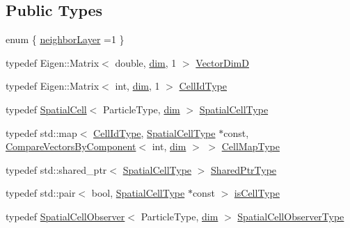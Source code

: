 \subsection*{Public Types}
\begin{DoxyCompactItemize}
\item 
enum \{ \hyperlink{structmodel_1_1_spatial_cell_a477a83780a744121d409df1bc0612d94a0faf1db991c3be6255b6273fdffe2eea}{neighbor\+Layer} =1
 \}
\item 
typedef Eigen\+::\+Matrix$<$ double, \hyperlink{plot_nd_a_8m_a382f3ca768b275b8d563604f7fc7df73}{dim}, 1 $>$ \hyperlink{structmodel_1_1_spatial_cell_aeaaeb951297c67dde8b981038936d7b8}{Vector\+Dim\+D}
\item 
typedef Eigen\+::\+Matrix$<$ int, \hyperlink{plot_nd_a_8m_a382f3ca768b275b8d563604f7fc7df73}{dim}, 1 $>$ \hyperlink{structmodel_1_1_spatial_cell_acc48b0ece2bb5487d1ea96903dbbe626}{Cell\+Id\+Type}
\item 
typedef \hyperlink{structmodel_1_1_spatial_cell}{Spatial\+Cell}$<$ Particle\+Type, \hyperlink{plot_nd_a_8m_a382f3ca768b275b8d563604f7fc7df73}{dim} $>$ \hyperlink{structmodel_1_1_spatial_cell_a21ae9e280e12b732db8ac384d6fb587c}{Spatial\+Cell\+Type}
\item 
typedef std\+::map$<$ \hyperlink{structmodel_1_1_spatial_cell_acc48b0ece2bb5487d1ea96903dbbe626}{Cell\+Id\+Type}, \hyperlink{structmodel_1_1_spatial_cell_a21ae9e280e12b732db8ac384d6fb587c}{Spatial\+Cell\+Type} $\ast$const, \hyperlink{structmodel_1_1_compare_vectors_by_component}{Compare\+Vectors\+By\+Component}$<$ int, \hyperlink{plot_nd_a_8m_a382f3ca768b275b8d563604f7fc7df73}{dim} $>$ $>$ \hyperlink{structmodel_1_1_spatial_cell_a4c03425d6c8328b5587c9b385d1b9a26}{Cell\+Map\+Type}
\item 
typedef std\+::shared\+\_\+ptr$<$ \hyperlink{structmodel_1_1_spatial_cell_a21ae9e280e12b732db8ac384d6fb587c}{Spatial\+Cell\+Type} $>$ \hyperlink{structmodel_1_1_spatial_cell_a56a68d3fd3cfc47cf95d633b12015dc6}{Shared\+Ptr\+Type}
\item 
typedef std\+::pair$<$ bool, \hyperlink{structmodel_1_1_spatial_cell_a21ae9e280e12b732db8ac384d6fb587c}{Spatial\+Cell\+Type} $\ast$const  $>$ \hyperlink{structmodel_1_1_spatial_cell_aca247866eb0d2f81722f76d5ea238f8b}{is\+Cell\+Type}
\item 
typedef \hyperlink{structmodel_1_1_spatial_cell_observer}{Spatial\+Cell\+Observer}$<$ Particle\+Type, \hyperlink{plot_nd_a_8m_a382f3ca768b275b8d563604f7fc7df73}{dim} $>$ \hyperlink{structmodel_1_1_spatial_cell_a49c66deddb4da22e03f44027d5464660}{Spatial\+Cell\+Observer\+Type}

\end{DoxyCompactItemize}
